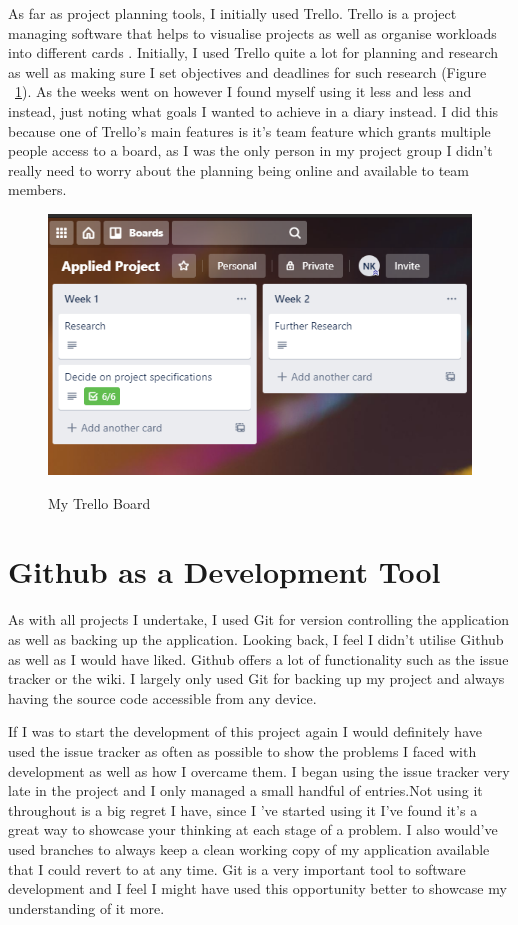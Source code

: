 As far as project planning tools, I initially used Trello. Trello is a project managing software that helps to visualise projects as well as organise workloads into different cards \cite{wiki:trello}. Initially, I used Trello quite a lot for planning and research as well as making sure I set objectives and deadlines for such research (Figure ~\ref{trello_label}). As the weeks went on however I found myself using it less and less and instead, just noting what goals I wanted to achieve in a diary instead. I did this because one of Trello's main features is it's team feature which grants multiple people access to a board, as I was the only person in my project group I didn't really need to worry about the planning being online and available to team members.

\begin{figure}
        \centering
        \includegraphics[scale=0.6]{Images/Trello.png} 
        \label{trello_label}
        \caption{My Trello Board}
\end{figure}

\section{Github as a Development Tool}
As with all projects I undertake, I used Git for version controlling the application as well as backing up the application. Looking back, I feel I didn't utilise Github as well as I would have liked. Github offers a lot of functionality such as the issue tracker or the wiki. I largely only used Git for backing up my project and always having the source code accessible from any device.

If I was to start the development of this project again I would definitely have used the issue tracker as often as possible to show the problems I faced with development as well as how I overcame them. I began using the issue tracker very late in the project and I only managed a small handful of entries.Not using it throughout is a  big regret I have, since I 've started using it I've found it's a great way to showcase your thinking at each stage of a problem. I also would've used branches to always keep a clean working copy of my application available that I could revert to at any time. Git is a very important tool to software development and I feel I might have used this opportunity better to showcase my understanding of it more.


